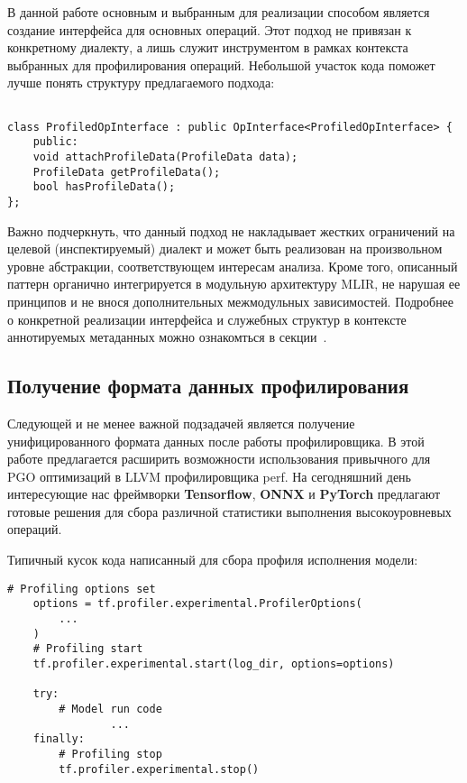 В данной работе основным и выбранным для реализации способом является создание интерфейса для основных операций.
Этот подход не привязан к конкретному диалекту, а лишь служит инструментом в рамках контекста выбранных для профилирования операций.
Небольшой участок кода поможет лучше понять структуру предлагаемого подхода:

\begin{lstlisting}[caption={Структура реализуемого интерфейса}]

class ProfiledOpInterface : public OpInterface<ProfiledOpInterface> {
    public:
    void attachProfileData(ProfileData data);
    ProfileData getProfileData();
    bool hasProfileData();
};

\end{lstlisting}

Важно подчеркнуть, что данный подход не накладывает жестких ограничений на целевой (инспектируемый) диалект и может быть реализован на произвольном уровне абстракции, соответствующем интересам анализа.
Кроме того, описанный паттерн органично интегрируется в модульную архитектуру MLIR, не нарушая ее принципов и не внося дополнительных межмодульных зависимостей.
Подробнее о конкретной реализации интерфейса и служебных структур в контексте аннотируемых метаданных можно ознакомться в секции~.

\subsection{Получение формата данных профилирования}

Следующей и не менее важной подзадачей является получение унифицированного формата данных после работы профилировщика.
В этой работе предлагается расширить возможности использования привычного для PGO оптимизаций в LLVM профилировщика perf.
На сегодняшний день интересующие нас фреймворки \textbf{Tensorflow}, \textbf{ONNX} и \textbf{PyTorch} предлагают готовые решения для сбора различной статистики выполнения высокоуровневых операций.

Типичный кусок кода написанный для сбора профиля исполнения модели:

\begin{lstlisting}[caption={Получение профиля с помощью утилиты фреймворка \textbf{Tensorflow}}]
    # Profiling options set
    options = tf.profiler.experimental.ProfilerOptions(
        ...
    )
    # Profiling start
    tf.profiler.experimental.start(log_dir, options=options)

    try:
        # Model run code
                ...
    finally:
        # Profiling stop
        tf.profiler.experimental.stop()
\end{lstlisting}

